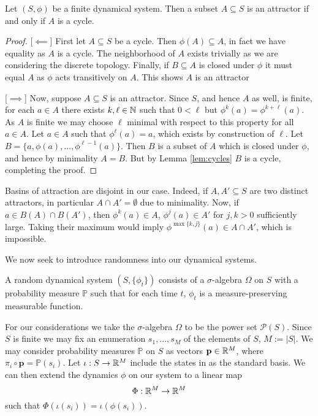 \begin{thm}[label=thm:attractorCycle]
    Let $(S,\phi)$ be a finite dynamical system. Then a subset $A \subseteq S$ is an attractor if and only if $A$ is a cycle.
\end{thm}
\begin{proof}[Proof]
    [$\impliedby$] First let $A \subseteq S$ be a cycle. Then $\phi(A) \subseteq A$, in fact we have equality as $A$ is a cycle. The neighborhood of $A$ exists trivially as we are considering the discrete topology. Finally, if $B \subseteq A$ is closed under $\phi$ it must equal $A$ as $\phi$ acts transitively on $A$. This shows $A$ is an attractor

    [$\implies$] Now, suppose $A \subseteq S$ is an attractor. Since $S$, and hence $A$ as well, is finite, for each $a \in A$ there exists $k,\ell \in \mathbb N$ such that $0 < \ell$ but $\phi^k(a) = \phi^{k+\ell}(a)$. As $A$ is finite we may choose $\ell$ minimal with respect to this property for all $a \in A$. Let $a \in A$ such that $\phi^\ell(a) = a$, which exists by construction of $\ell$. Let $B = \{a,\phi(a),...,\phi^{\ell-1}(a)\}$. Then $B$ is a subset of $A$ which is closed under $\phi$, and hence by minimality $A = B$. But by Lemma \ref{lem:cycles} $B$ is a cycle, completing the proof.
\end{proof}

Basins of attraction are disjoint in our case. Indeed, if $A,A'\subseteq S$ are two distinct attractors, in particular $A\cap A' = \emptyset$ due to minimality. Now, if $a \in B(A)\cap B(A')$, then $\phi^k(a) \in A$, $\phi^j(a) \in A'$ for $j,k > 0$ sufficiently large. Taking their maximum would imply $\phi^{\max\{k,j\}}(a) \in A\cap A'$, which is impossible.


We now seek to introduce randomness into our dynamical systems.


\begin{defn}[label=defn:randDynSyst]
    A random dynamical system $(S,\{\phi_t\})$ consists of a $\sigma$-algebra $\Omega$ on $S$ with a probability measure $\mathbb{P}$ such that for each time $t$, $\phi_t$ is a measure-preserving measurable function.
\end{defn}

For our considerations we take the $\sigma$-algebra $\Omega$ to be the power set $\mathscr{P}(S)$. Since $S$ is finite we may fix an enumeration $s_1,...,s_M$ of the elements of $S$, $M := |S|$. We may consider probability measures $\mathbb{P}$ on $S$ as vectors $\mathbf{p} \in \mathbb R^M$, where $\pi_i\circ \mathbf{p} = \mathbb{P}(s_i)$. Let $\iota:S\rightarrow \mathbb R^M$ include the states in as the standard basis. We can then extend the dynamics $\phi$ on our system to a linear map $$\Phi:\mathbb R^M\rightarrow \mathbb R^M$$
such that $\Phi(\iota(s_i)) = \iota(\phi(s_i))$.


